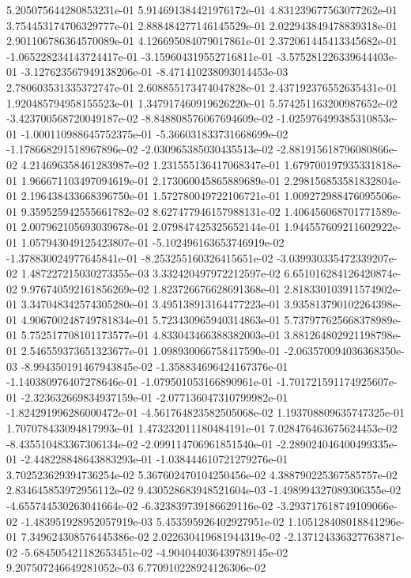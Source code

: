 5.205075644280853231e-01
5.914691384421976172e-01
4.831239677563077262e-01
3.754453174706329777e-01
2.888484277146145529e-01
2.022943849478839318e-01
2.901106786364570089e-01
4.126695084079017861e-01
2.372061445413345682e-01
-1.065228234143724417e-01
-3.159604319552716811e-01
-3.575281226339644403e-01
-3.127623567949138206e-01
-8.471410238093014453e-03
2.780603531335372747e-01
2.608855173474047828e-01
2.437192376552635431e-01
1.920485794958155523e-01
1.347917460919626220e-01
5.574251163200987652e-02
-3.423700568720049187e-02
-8.848808576067694609e-02
-1.025976499385310853e-01
-1.000110988645752375e-01
-5.366031833731668699e-02
-1.178668291518967896e-02
-2.030965385030435513e-02
-2.881915618796080866e-02
4.214696358461283987e-02
1.231555136417068347e-01
1.679700197935331818e-01
1.966671103497094619e-01
2.173060045865889689e-01
2.298156853581832804e-01
2.196438433668396750e-01
1.572780049722106721e-01
1.009272988476095506e-01
9.359525942555661782e-02
8.627477946157988131e-02
1.406456068701771589e-01
2.007962105693039678e-01
2.079847425325652144e-01
1.944557609211602922e-01
1.057943049125423807e-01
-5.102496163653746919e-02
-1.378830024977645841e-01
-8.253255160326415651e-02
-3.039930335472339207e-02
1.487227215030273355e-03
3.332420497972212597e-02
6.651016284126420874e-02
9.976740592161856269e-02
1.823726676628691368e-01
2.818330103911574902e-01
3.347048342574305280e-01
3.495138913164477223e-01
3.935813790102264398e-01
4.906700248749781834e-01
5.723430965940314863e-01
5.737977625668378989e-01
5.752517708101173577e-01
4.833043466388382003e-01
3.881264802921198798e-01
2.546559373651323677e-01
1.098930066758417590e-01
-2.063570094036368350e-03
-8.994350191467943845e-02
-1.358834696424167376e-01
-1.140380976407278646e-01
-1.079501053166890961e-01
-1.701721591174925607e-01
-2.323632669834937159e-01
-2.077136047310799982e-01
-1.824291996286000472e-01
-4.561764823582505068e-02
1.193708809635747325e-01
1.707078433094817993e-01
1.473232011180484191e-01
7.028476463675624453e-02
-8.435510483367306134e-02
-2.099114706961851540e-01
-2.289024046400499335e-01
-2.448228848643883293e-01
-1.038444610721279276e-01
3.702523629394736254e-02
5.367602470104250456e-02
4.388790225367585757e-02
2.834645853972956112e-02
9.430528683948521604e-03
-1.498994327089306355e-02
-4.655744530263041664e-02
-6.323839739186629116e-02
-3.293717618749109066e-02
-1.483951928952057919e-03
5.453595926402927951e-02
1.105128408018841296e-01
7.349624308576445386e-02
2.022630419681944319e-02
-2.137124336327763871e-02
-5.684505421182653451e-02
-4.904044036439789145e-02
9.207507246649281052e-03
6.770910228924126306e-02
